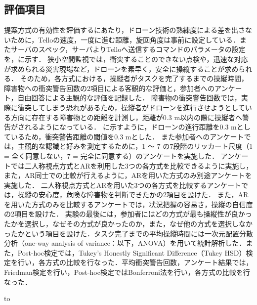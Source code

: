 \documentclass[submit, sigrecommended]{ipsj}
\begin{document}
\subsection{評価項目}
提案方式の有効性を評価するにあたり，ドローン技術の熟練度による差を出さないために，Telloの速度，一度に進む距離，旋回角度は事前に設定している．またサーバのスペック，サーバよりTelloへ送信するコマンドのパラメータの設定を，に示す．
狭小空間監視では，衝突することのできない点検や，迅速な対応が求められる災害現場など，ドローンを素早く，安全に操縦することが求められる．
そのため，各方式における，操縦者がタスクを完了するまでの操縦時間，障害物への衝突警告回数の2項目による客観的な評価と，参加者へのアンケート，自由回答による主観的な評価を記録した．
障害物の衝突警告回数では，実際に衝突してしまう恐れがあるため，操縦者がドローンを進行させようとしている方向に存在する障害物との距離を計測し，距離が0.3 m以内の際に操縦者へ警告がされるようになっている．
に示すように，ドローンの進行距離を0.3 mとしているため，衝突警告距離の閾値を0.3 mとした．
また参加者へのアンケートでは，主観的な認識と好みを測定するために，1 〜 7 の7段階のリッカート尺度（1 = 全く同意しない，7 = 完全に同意する）のアンケートを実施した．
アンケートでは二人称視点方式とARを利用した3つの各方式を比較できるように実施し，また，AR同士での比較が行えるように，ARを用いた方式のみ別途アンケートを実施した．
二人称視点方式とARを用いた3つの各方式を比較するアンケートでは，操縦の安心度，危険な障害物を判断できたかの2項目を設けた．
また，ARを用いた方式のみを比較するアンケートでは，状況把握の容易さ，操縦の自信度の2項目を設けた．
実験の最後には，参加者にはどの方式が最も操縦性が良かったかを選択し，なぜその方式が良かったのか，また，なぜ他の方式を選択しなかったかという項目を設けた．タスク完了までの平均操縦時間には一次元配置分散分析（one-way analysis of variance：以下，ANOVA）を用いて統計解析した．また，Post-hoc検定では，Tukey’s Honestly Significant Difference（Tukey HSD）検定を行い，各方式の比較を行なった．平均衝突警告回数，アンケート結果では，Friedman検定を行い，Post-hoc検定ではBonferroni法を行い，各方式の比較を行なった．



\begin{table}[tb] 
  \caption{サーバの性能} 
  \label{tab:server_spec}
  \hbox to
\end{table}
\end{document}

